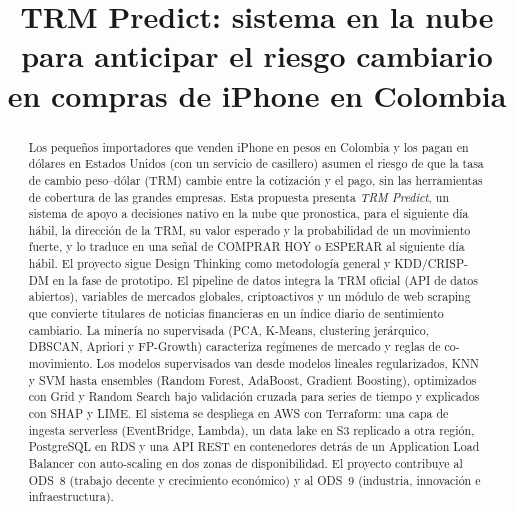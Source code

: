 \documentclass[conference]{IEEEtran}
\begin{document}
\title{TRM Predict: sistema en la nube para anticipar el riesgo cambiario en compras de iPhone en Colombia}

\author{
}

\maketitle

\begin{abstract}
Los pequeños importadores que venden iPhone en pesos en Colombia y los pagan en dólares en Estados Unidos (con un servicio de casillero) asumen el riesgo de que la tasa de cambio peso--dólar (TRM) cambie entre la cotización y el pago, sin las herramientas de cobertura de las grandes empresas. Esta propuesta presenta \emph{TRM Predict}, un sistema de apoyo a decisiones nativo en la nube que pronostica, para el siguiente día hábil, la dirección de la TRM, su valor esperado y la probabilidad de un movimiento fuerte, y lo traduce en una señal de COMPRAR HOY o ESPERAR al siguiente día hábil. El proyecto sigue Design Thinking como metodología general y KDD/CRISP-DM en la fase de prototipo. El pipeline de datos integra la TRM oficial (API de datos abiertos), variables de mercados globales, criptoactivos y un módulo de web scraping que convierte titulares de noticias financieras en un índice diario de sentimiento cambiario. La minería no supervisada (PCA, K-Means, clustering jerárquico, DBSCAN, Apriori y FP-Growth) caracteriza regímenes de mercado y reglas de co-movimiento. Los modelos supervisados van desde modelos lineales regularizados, KNN y SVM hasta ensembles (Random Forest, AdaBoost, Gradient Boosting), optimizados con Grid y Random Search bajo validación cruzada para series de tiempo y explicados con SHAP y LIME. El sistema se despliega en AWS con Terraform: una capa de ingesta serverless (EventBridge, Lambda), un data lake en S3 replicado a otra región, PostgreSQL en RDS y una API REST en contenedores detrás de un Application Load Balancer con auto-scaling en dos zonas de disponibilidad. El proyecto contribuye al ODS~8 (trabajo decente y crecimiento económico) y al ODS~9 (industria, innovación e infraestructura).
\end{abstract}
\end{document}
